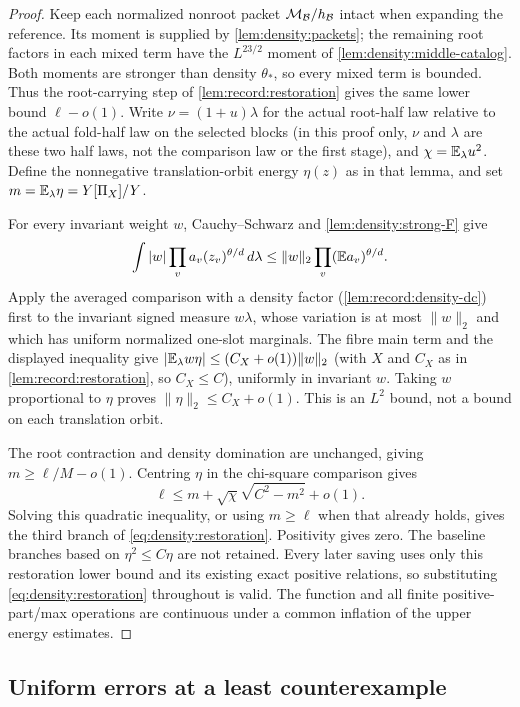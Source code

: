 \begin{proof}
Keep each normalized nonroot packet $\mathcal M_\mathcal B/h_\mathcal B$ intact
when expanding the reference. Its moment is supplied by
\cref{lem:density:packets}; the remaining root factors in each mixed
term have the $L^{23/2}$ moment of \cref{lem:density:middle-catalog}.
Both moments are stronger than density $\theta_*$, so every mixed term
is bounded. Thus the root-carrying step of
\cref{lem:record:restoration} gives the same lower bound $\ell-o(1)$.
Write $\nu=(1+u)\lambda$ for the actual root-half law relative
to the actual fold-half law on the selected blocks (in this proof
only, $\nu$ and $\lambda$ are these two half laws, not the
comparison law or the first stage), and $\chi=\mathbb E_\lambda u^2$. Define the nonnegative translation-orbit energy
$\eta(z)$ as in that lemma, and set
$m=\mathbb E_\lambda\eta=Y[\Pi_X]/Y$.

For every invariant weight $w$, Cauchy--Schwarz and
\cref{lem:density:strong-F} give
\[
 \int |w|\prod_v a_v(z_v)^{\theta/d}\,d\lambda
 \le\|w\|_2\prod_v(\mathbb E a_v)^{\theta/d}.
\]
Apply the averaged comparison with a density factor
(\cref{lem:record:density-dc}) first to the invariant signed measure
$w\lambda$, whose variation is at most $\|w\|_2$ and which has uniform
normalized one-slot marginals. The fibre main term and the displayed inequality give $|\mathbb E_\lambda w\eta|\le(C_X+o(1))\|w\|_2$ (with $X$ and $C_X$ as in \cref{lem:record:restoration}, so $C_X\le C$),
uniformly in invariant $w$. Taking $w$ proportional to $\eta$ proves
$\|\eta\|_2\le C_X+o(1)$. This is an $L^2$ bound, not a bound on
each translation orbit.

The root contraction and density domination are unchanged, giving
$m\ge\ell/M-o(1)$. Centring $\eta$ in the chi-square comparison gives
\[
 \ell\le m+\sqrt\chi\sqrt{C^2-m^2}+o(1).
\]
Solving this quadratic inequality, or using $m\ge\ell$ when that
already holds, gives the third branch of
\eqref{eq:density:restoration}. Positivity gives zero. The baseline
branches based on $\eta^2\le C\eta$ are not retained. Every later
saving uses only this restoration lower bound and its existing exact
positive relations, so substituting \eqref{eq:density:restoration}
throughout is valid. The function and all finite positive-part/max operations are
continuous under a common inflation of the upper energy estimates.
\end{proof}

\subsection{Uniform errors at a least counterexample}

